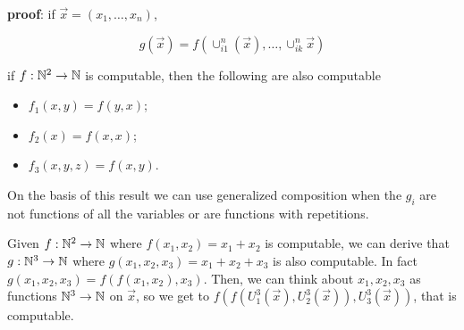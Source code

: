 \textbf{proof}: if $\vec{x} = (x_1,\dots, x_n)$,

\begin{equation*}
  g(\vec{x}) = f(\cup_{i1}^n(\vec{x}),\dots,\cup_{ik}^n\vec{x})
\end{equation*}

\fi


\begin{example}
  if $f:\mathbb{N}^2 \rightarrow \mathbb{N} $ is computable, then the following are also computable
\begin{itemize}
\item $f_1(x,y) = f(y,x)$;
\item $f_2(x) = f(x,x)$;
\item $f_3(x,y,z) = f(x,y)$.
\end{itemize}
\end{example}


\begin{remark}
  On the basis of this result we can use generalized composition when the $g_i$ are not functions of all the variables or are functions with repetitions.
\end{remark}

\begin{example}
  Given $f: \mathbb{N}^2 \rightarrow \mathbb{N}$ where $ f(x_1,x_2) = x_1 + x_2 $ is computable, we can derive that $g: \mathbb{N}^3 \rightarrow \mathbb{N}$ where $ g(x_1,x_2,x_3) = x_1 + x_2 + x_3 $ is also computable.
  In fact $g(x_1,x_2,x_3) = f(f(x_1,x_2),x_3) $. Then, we can think about $x_1,x_2,x_3$ as functions $\mathbb{N}^3\rightarrow\mathbb{N}$ on $\vec{x}$, so we get to $f(f(U_1^3(\vec{x}),U_2^3(\vec{x})), U_3^3(\vec{x}))$, that is computable.
\end{example}

